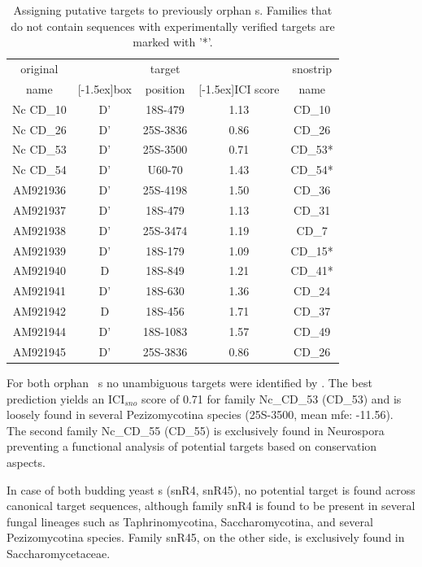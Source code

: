 \begin{table}
  \caption{Assigning putative targets to previously
    orphan \cd s. Families that do not contain sequences with
    experimentally verified targets are marked with '*'. }
  \label{tab:orphan_cd_snoRNAs_short}
  \begin{center}
    \begin{footnotesize}
      \begin{tabular}{c|c|c|c|c}
      original&&target&&snostrip\\
      name&\raisebox{1.5ex}[-1.5ex]{box}&position&\raisebox{1.5ex}[-1.5ex]{ICI
      score}&name\\
  \hline
  Nc CD\_10&D'&18S-479&1.13&CD\_10\\
\hline
  Nc CD\_26&D'&25S-3836&0.86&CD\_26\\
\hline
  Nc CD\_53&D'&25S-3500&0.71&CD\_53*\\
\hline
  Nc CD\_54&D'&U60-70&1.43&CD\_54*\\
 \hline
  AM921936&D'&25S-4198&1.50&CD\_36\\
\hline
  AM921937&D'&18S-479&1.13&CD\_31\\
\hline
  AM921938&D'&25S-3474&1.19&CD\_7\\
\hline
  AM921939&D'&18S-179&1.09&CD\_15*\\
\hline
  AM921940&D&18S-849&1.21&CD\_41*\\
\hline
  AM921941&D'&18S-630&1.36&CD\_24\\
\hline
  AM921942&D&18S-456&1.71&CD\_37\\
\hline
  AM921944&D'&18S-1083&1.57&CD\_49\\
\hline
  AM921945&D'&25S-3836&0.86&CD\_26\\

    \end{tabular}
    \end{footnotesize}
  \end{center} 
\end{table}

For both orphan \ncr\ \sno s no unambiguous targets were identified by
\snostrip. The best prediction yields an ICI$_{sno}$ score of 0.71 for
family Nc\_CD\_53 (CD\_53) and is loosely found in several
Pezizomycotina species (25S-3500, mean mfe: -11.56). The second family
Nc\_CD\_55 (CD\_55) is exclusively found in Neurospora preventing a
functional analysis of potential targets based on conservation
aspects.

In case of both budding yeast \sno s (snR4, snR45), no potential
target is found across canonical target sequences, although family
snR4 is found to be present in several fungal lineages such as
Taphrinomycotina, Saccharomycotina, and several Pezizomycotina
species. Family snR45, on the other side, is exclusively found in
Saccharomycetaceae.

